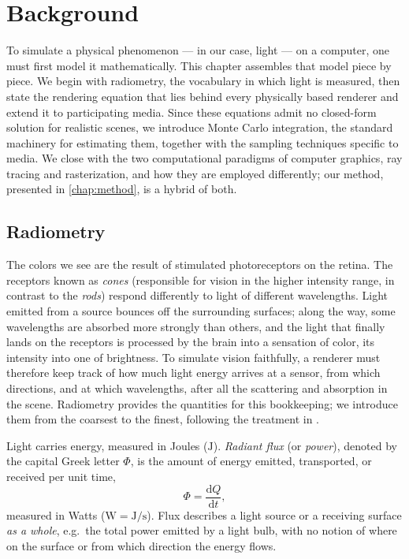 \chapter{Background}
\label{chap:background}


To simulate a physical phenomenon --- in our case, light --- on a computer, one must first model it mathematically. This chapter assembles that model piece by piece. We begin with radiometry, the vocabulary in which light is measured, then state the rendering equation that lies behind every physically based renderer and extend it to participating media. Since these equations admit no closed-form solution for realistic scenes, we introduce Monte Carlo integration, the standard machinery for estimating them, together with the sampling techniques specific to media. We close with the two computational paradigms of computer graphics, ray tracing and rasterization, and how they are employed differently; our method, presented in \cref{chap:method}, is a hybrid of both.

\section{Radiometry}
\label{sec:bg_radiometry}
The colors we see are the result of stimulated photoreceptors on the retina. The receptors known as \emph{cones} (responsible for vision in the higher intensity range, in contrast to the \emph{rods}) respond differently to light of different wavelengths. Light emitted from a source bounces off the surrounding surfaces; along the way, some wavelengths are absorbed more strongly than others, and the light that finally lands on the receptors is processed by the brain into a sensation of color, its intensity into one of brightness. To simulate vision faithfully, a renderer must therefore keep track of how much light energy arrives at a sensor, from which directions, and at which wavelengths, after all the scattering and absorption in the scene. Radiometry provides the quantities for this bookkeeping; we introduce them from the coarsest to the finest, following the treatment in \cite{pharr23pbrt}.

Light carries energy, measured in Joules ($\mathrm{J}$). \emph{Radiant flux} (or \emph{power}), denoted by the capital Greek letter $\Phi$, is the amount of energy emitted, transported, or received per unit time,
\begin{equation}
	\Phi = \frac{\mathrm{d}Q}{\mathrm{d}t},
\end{equation}
measured in Watts ($\mathrm{W} = \mathrm{J/s}$). Flux describes a light source or a receiving surface \emph{as a whole}, e.g.\ the total power emitted by a light bulb, with no notion of where on the surface or from which direction the energy flows.

